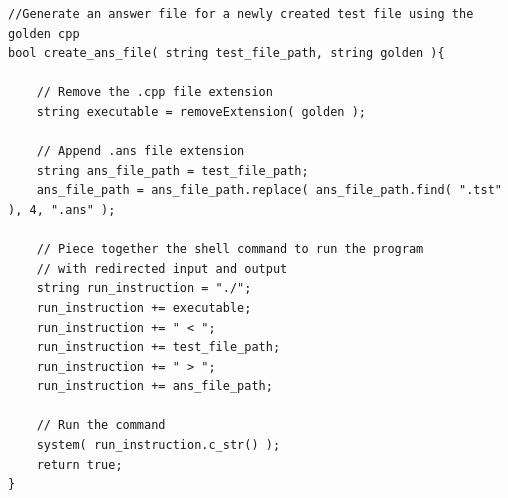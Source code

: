 \begin{lstlisting}
//Generate an answer file for a newly created test file using the golden cpp
bool create_ans_file( string test_file_path, string golden ){

    // Remove the .cpp file extension
    string executable = removeExtension( golden );

    // Append .ans file extension 
    string ans_file_path = test_file_path;
    ans_file_path = ans_file_path.replace( ans_file_path.find( ".tst" ), 4, ".ans" );

    // Piece together the shell command to run the program
    // with redirected input and output
    string run_instruction = "./";
    run_instruction += executable; 
    run_instruction += " < ";
    run_instruction += test_file_path;
    run_instruction += " > ";
    run_instruction += ans_file_path;

    // Run the command
    system( run_instruction.c_str() );
    return true;
}
\end{lstlisting}

